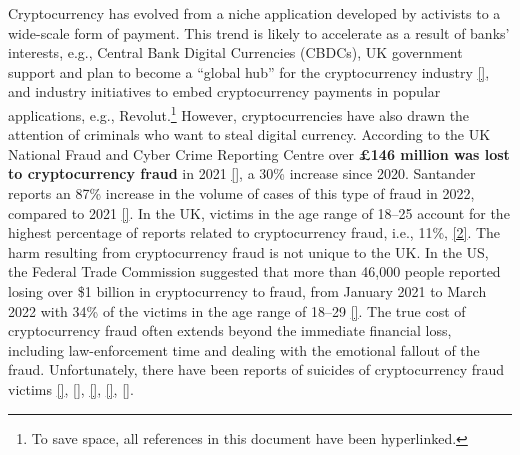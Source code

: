  Cryptocurrency has evolved from a niche application developed by activists to a wide-scale form of payment. This trend is likely to accelerate as a result of banks' interests, e.g., Central Bank Digital Currencies (CBDCs), UK government support and plan to become a ``global hub'' for the cryptocurrency industry \href{https://www.ft.com/content/24c9b6de-9cc6-4413-8b6a-e60653a29ce0?shareType=nongift}{[\printcntr]}, and industry initiatives to embed cryptocurrency payments in popular applications, e.g., Revolut.\footnote{{\small{To save space, all references in this document have been hyperlinked.}}} However, cryptocurrencies have also drawn the attention of criminals who want to steal digital currency. According to the UK National Fraud and Cyber Crime Reporting Centre over \textbf{£146 million was lost to cryptocurrency fraud} in 2021 \href{https://www.actionfraud.police.uk/news/cryptocurrency-fraud-leads-to-millions-in-losses-so-far-this-year} {[\printcntr]}, a 30\% increase since 2020. Santander reports an 87\% increase in the volume of cases of this type of fraud in 2022, compared to 2021 \href{https://www.santander.co.uk/about-santander/media-centre/press-releases/santander-warns-about-celebrity-endorsed-crypto-scams}{[\printcntr]}. In the UK, victims in the age range of 18–25 account for the highest percentage of reports related to cryptocurrency fraud, i.e., 11\%, \href{https://www.actionfraud.police.uk/news/cryptocurrency-fraud-leads-to-millions-in-losses-so-far-this-year} {[2]}. The harm resulting from cryptocurrency fraud is not unique to the UK. In the US, the Federal Trade Commission suggested that more than 46,000 people reported losing over \$1 billion in cryptocurrency to fraud, from January 2021 to March 2022 with 34\% of the victims in the age range of 18–29 \href{https://www.ftc.gov/news-events/data-visualizations/data-spotlight/2022/06/reports-show-scammers-cashing-crypto-craze}{[\printcntr]}. The true cost of cryptocurrency fraud often extends beyond the immediate financial loss, including law-enforcement time and dealing with the emotional fallout of the fraud. Unfortunately, there have been reports of suicides of cryptocurrency fraud victims 
 \href{https://www.vice.com/en/article/pkgda8/qanon-crypto-scam-whiplash347}{[\printcntr]},  \href{https://www.ozy.com/around-the-world/the-billion-dollar-crypto-currency-scams-youve-never-heard-about/266860/}{[\printcntr]},  \href{https://www.arabnews.com/node/1847671/middle-east}{[\printcntr]},  \href{https://english.sakshi.com/news/crime/suryapet-mans-suicide-over-cryptocurrency-fraud-could-be-tip-iceberg-147223}{[\printcntr]},  \href{https://www.reddit.com/r/CryptoCurrency/comments/r4asjl/someone_has_committed_suicide_after_losing_their/}{[\printcntr]}. 
 




